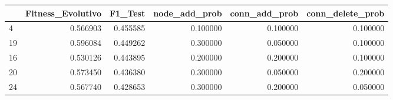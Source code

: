 \begin{tabular}{lrrrrr}
\toprule
 & Fitness_Evolutivo & F1_Test & node_add_prob & conn_add_prob & conn_delete_prob \\
\midrule
4 & 0.566903 & 0.455585 & 0.100000 & 0.100000 & 0.100000 \\
19 & 0.596084 & 0.449262 & 0.300000 & 0.050000 & 0.100000 \\
16 & 0.530126 & 0.443895 & 0.200000 & 0.200000 & 0.100000 \\
20 & 0.573450 & 0.436380 & 0.300000 & 0.050000 & 0.200000 \\
24 & 0.567740 & 0.428653 & 0.300000 & 0.200000 & 0.050000 \\
\bottomrule
\end{tabular}
